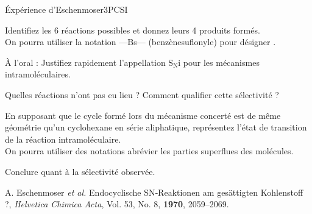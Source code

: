 \begin{exercise}{\'Expérience d'Eschenmoser}{3}{PCSI}
\begin{questions}
\question Identifiez les 6 réactions possibles et donnez leurs 4 produits formés. \\
On pourra utiliser la notation ---Bs--- (benzènesuflonyle) pour désigner \hspace{-1em} {\footnotesize{}}.

\question \textsf{À l'oral :} Justifiez rapidement l'appellation $\mathrm{S_Ni}$ pour les mécanismes intramoléculaires.


\question Quelles réactions n'ont pas eu lieu ? Comment qualifier cette sélectivité ?


\question En supposant que le cycle formé lors du mécanisme concerté est de  même géométrie qu'un cyclohexane en série aliphatique, représentez l'état de transition de la réaction intramoléculaire. \\
On pourra utiliser des notations abrévier les parties superflues des molécules.

\question Conclure quant à la sélectivité observée.

\plusloin A. Eschenmoser \emph{et al.} Endocyclische SN‐Reaktionen am gesättigten Kohlenstoff ?, \textit{Helvetica Chimica Acta}, Vol. 53, No. 8, \textbf{1970},  2059--2069.

\end{questions}
\end{exercise}